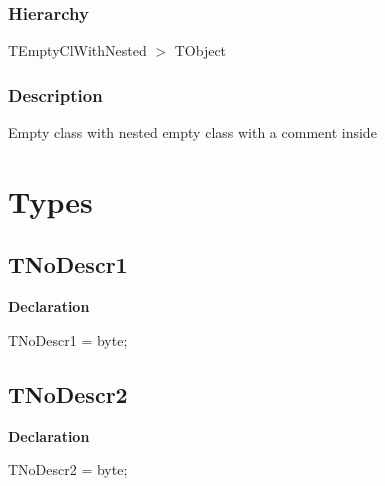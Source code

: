\documentclass{report}
\begin{document}
\subsubsection*{\large{\textbf{Hierarchy}}\normalsize\hspace{1ex}\hfill}
TEmptyClWithNested {$>$} TObject
\subsubsection*{\large{\textbf{Description}}\normalsize\hspace{1ex}\hfill}
Empty class with nested empty class with a comment inside\section{Types}
\subsection*{TNoDescr1}
\begin{list}{}{
\setlength{\itemindent}{0cm}
\setlength{\listparindent}{0cm}
\setlength{\leftmargin}{\evensidemargin}
\addtolength{\leftmargin}{\tmplength}
\settowidth{\labelsep}{X}
\addtolength{\leftmargin}{\labelsep}
\setlength{\labelwidth}{\tmplength}
}
\begin{flushleft}
\item[\textbf{Declaration}\hfill]
\begin{ttfamily}
TNoDescr1 = byte;\end{ttfamily}


\end{flushleft}
\end{list}
\subsection*{TNoDescr2}
\begin{list}{}{
\setlength{\itemindent}{0cm}
\setlength{\listparindent}{0cm}
\setlength{\leftmargin}{\evensidemargin}
\addtolength{\leftmargin}{\tmplength}
\settowidth{\labelsep}{X}
\addtolength{\leftmargin}{\labelsep}
\setlength{\labelwidth}{\tmplength}
}
\begin{flushleft}
\item[\textbf{Declaration}\hfill]
\begin{ttfamily}
TNoDescr2 = byte;\end{ttfamily}


\end{flushleft}
\end{list}
\end{document}
